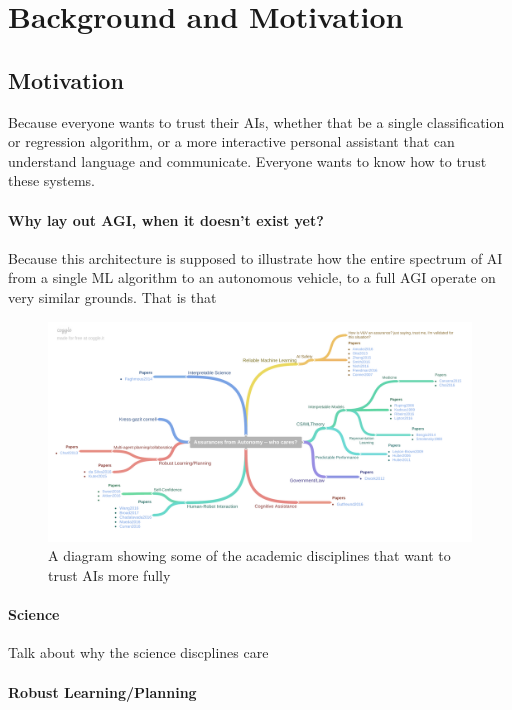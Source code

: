\section{Background and Motivation}

\subsection{Motivation}
    Because everyone wants to trust their AIs, whether that be a single classification or regression algorithm, or a more interactive personal assistant that can understand language and communicate. Everyone wants to know how to trust these systems.  

    \paragraph{Why lay out AGI, when it doesn't exist yet?} Because this architecture is supposed to illustrate how the entire spectrum of AI from a single ML algorithm to an autonomous vehicle, to a full AGI operate on very similar grounds. That is that 

	\begin{figure}
        \includegraphics[width=8in]{Figures/WhoCares.pdf}%
    	\caption{A diagram showing some of the academic disciplines that want to trust AIs more fully}
        \label{fig:WhoCares}
    \end{figure}

    \paragraph{Science} Talk about why the science discplines care
    \paragraph{Robust Learning/Planning}
